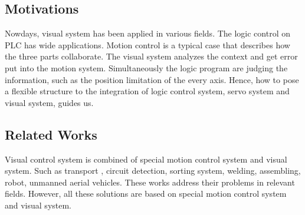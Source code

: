 \documentclass[journal,UTF8]{IEEEtran}
\begin{document}
\subsection{Motivations}
%
%
Nowdays, visual system has been applied in various fields. The logic control on PLC has wide applications. Motion control 
\cite{Chen2014A} is a typical case that describes how the three parts collaborate. The visual system analyzes the context and get error put into the motion system. Simultaneously the logic program are judging the information, such as the position limitation of the every axis. Hence, how to pose a flexible structure to the integration of logic control system, servo system and visual system, guides us.





\subsection{Related Works}

Visual control system is combined of special motion control system and visual system. Such as transport \cite{Xing2014Intersection}, circuit detection\cite{Nian2005An}, sorting system, welding\cite{Chen2014A}, assembling\cite{Wang2008Visual,Xiao2014Visual}, robot\cite{Wu2013Cloud,Tsai2017A}, unmanned aerial vehicles\cite{Guenard2010A,Serra2016Landing}. These works address their problems in relevant fields. However, all these solutions are based on special motion control system and visual system.

\end{document}
